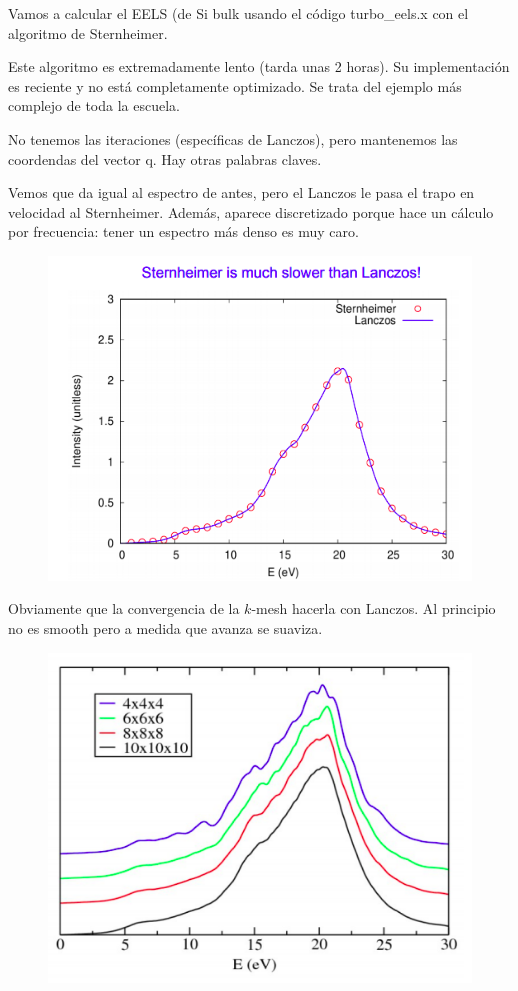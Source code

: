   Vamos a calcular el EELS (de Si bulk usando el código turbo\_eels.x con el algoritmo de Sternheimer.

  Este algoritmo es extremadamente lento (tarda unas 2 horas). Su implementación es reciente y no está completamente optimizado. Se trata del ejemplo más complejo de toda la escuela.

  No tenemos las iteraciones (específicas de Lanczos), pero mantenemos las coordendas del vector q. Hay otras palabras claves.

  Vemos que da igual al espectro de antes, pero el Lanczos le pasa el trapo en velocidad al Sternheimer. Además, aparece discretizado porque hace un cálculo por frecuencia: tener un espectro más denso es muy caro.
    \begin{figure}[H]
        \centering
        \includegraphics[scale = 0.7]{figs/D6/Ster.png}
    \end{figure}

  Obviamente que la convergencia de la $k$-mesh hacerla con Lanczos. Al principio no es smooth pero a medida que avanza se suaviza.
    \begin{figure}[H]
        \centering
        \includegraphics[scale = 0.7]{figs/D6/kmesh.png}
    \end{figure}

